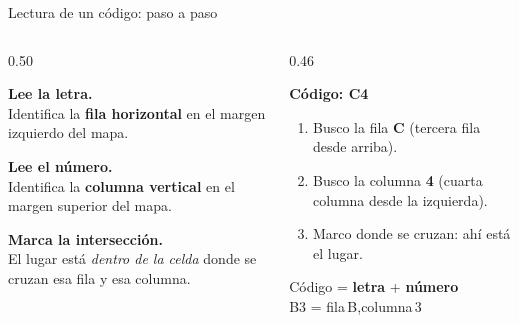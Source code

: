 \documentclass[aspectratio=169, 10pt, spanish]{beamer}
\begin{document}

\begin{frame}{Lectura de un código: paso a paso}
  \begin{columns}[c]
    \begin{column}{0.50\textwidth}
      \begin{pasobox}[1]
        \AlmFontSmall
        \textbf{Lee la letra.}\\
        Identifica la \textbf{fila horizontal}
        en el margen izquierdo del mapa.
      \end{pasobox}
      \vspace{6pt}
      \begin{pasobox}[2]
        \AlmFontSmall
        \textbf{Lee el número.}\\
        Identifica la \textbf{columna vertical}
        en el margen superior del mapa.
      \end{pasobox}
      \vspace{6pt}
      \begin{pasobox}[3]
        \AlmFontSmall
        \textbf{Marca la intersección.}\\
        El lugar está \emph{dentro de la celda}
        donde se cruzan esa fila y esa columna.
      \end{pasobox}
    \end{column}
    \begin{column}{0.46\textwidth}
      \begin{ejemplobox}
        \AlmFontSmall
        \textbf{Código: C4}\\[4pt]
        \begin{enumerate}
          \item Busco la fila \textbf{C}
                (tercera fila desde arriba).
          \item Busco la columna \textbf{4}
                (cuarta columna desde la izquierda).
          \item Marco donde se cruzan: ahí está el lugar.
        \end{enumerate}
      \end{ejemplobox}
      \vspace{6pt}
      \begin{formulabox}[AlmAzulM]
        \AlmFontSmall
        Código \;=\; \textbf{letra} + \textbf{número}\\[4pt]
        \AlmFontLarge B3 \;=\; fila\,B\;,\;columna\,3
      \end{formulabox}
    \end{column}
  \end{columns}
\end{frame}
\end{document}

